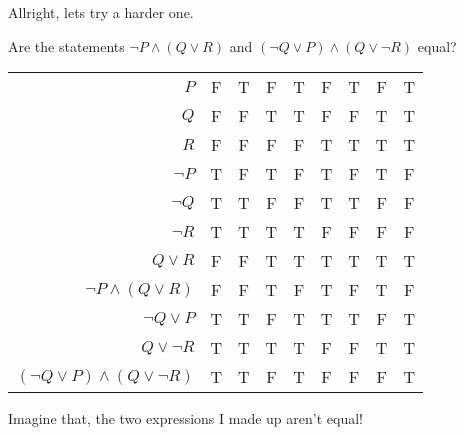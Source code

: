 Allright, lets try a harder one.

\begin{boxexample}{}{}
	Are the statements $\neg P \land (Q \lor R)$ and $(\neg Q \lor P) \land (Q \lor \neg R)$ equal?

	\medskip
	\begin{tabular}{r|c c c c c c c c}
		\hline
		\rowcolor{skyblue}
		$P$ & F & T & F & T & F & T & F & T\\
		\rowcolor{skyblue}
		$Q$ & F & F & T & T & F & F & T & T\\
		\rowcolor{skyblue}
		$R$ & F & F & F & F & T & T & T & T\\
		$\neg P$ & T & F & T & F & T & F & T & F\\
		$\neg Q$ & T & T & F & F & T & T & F & F\\
		$\neg R$ & T & T & T & T & F & F & F & F\\
		$Q \lor R$ & F & F & T & T & T & T & T & T\\
		\rowcolor{skyblue}
		$\neg P \land (Q \lor R)$ & F & F & T & F & T & F & T & F\\
		$\neg Q \lor P$ & T & T & F & T & T & T & F & T\\
		$Q \lor \neg R$ & T & T & T & T & F & F & T & T\\
		\rowcolor{skyblue}
		$(\neg Q \lor P) \land (Q \lor \neg R)$ & T & T & F & T & F & F & F & T\\
		\hline
	\end{tabular}
	\medskip

	Imagine that, the two expressions I made up aren't equal!
\end{boxexample}
